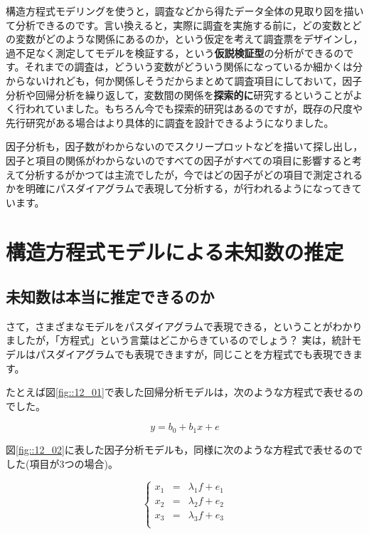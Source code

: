 \documentclass{ltjsbook}
\begin{document}
構造方程式モデリングを使うと，調査などから得たデータ全体の見取り図を描いて分析できるのです。言い換えると，実際に調査を実施する前に，どの変数とどの変数がどのような関係にあるのか，という仮定を考えて調査票をデザインし，過不足なく測定してモデルを検証する，という\textbf{仮説検証型}の分析ができるのです。それまでの調査は，どういう変数がどういう関係になっているか細かくは分からないけれども，何か関係しそうだからまとめて調査項目にしておいて，因子分析や回帰分析を繰り返して，変数間の関係を\textbf{探索的に}研究するということがよく行われていました。もちろん今でも探索的研究はあるのですが，既存の尺度や先行研究がある場合はより具体的に調査を設計できるようになりました。

因子分析も，因子数がわからないのでスクリープロットなどを描いて探し出し，因子と項目の関係がわからないのですべての因子がすべての項目に影響すると考えて分析するがかつては主流でしたが，今ではどの因子がどの項目で測定されるかを明確にパスダイアグラムで表現して分析する，が行われるようになってきています。



\section{構造方程式モデルによる未知数の推定}
\subsection{未知数は本当に推定できるのか}
さて，さまざまなモデルをパスダイアグラムで表現できる，ということがわかりましたが，「方程式」という言葉はどこからきているのでしょう？
実は，統計モデルはパスダイアグラムでも表現できますが，同じことを方程式でも表現できます。

たとえば図\ref{fig::12_01}で表した回帰分析モデルは，次のような方程式で表せるのでした。

\[ y = b_0 + b_1 x + e \]

図\ref{fig::12_02}に表した因子分析モデルも，同様に次のような方程式で表せるのでした(項目が3つの場合)。

\[ \left \{
	\begin{array}{rcl}
		x_1 & = & \lambda_1 f + e_1 \\
		x_2 & = & \lambda_2 f + e_2 \\
		x_3 & = & \lambda_3 f + e_3 \\
	\end{array}
	\right .
\]
\end{document}
